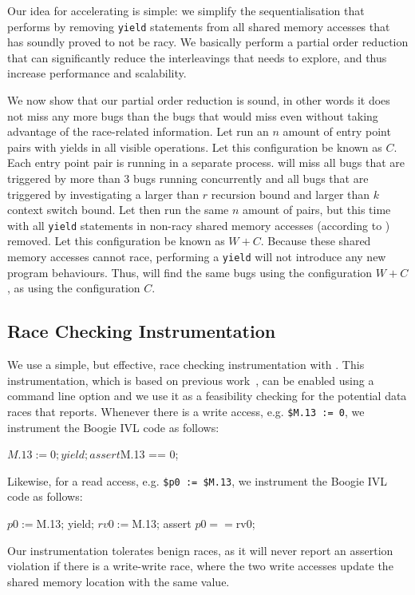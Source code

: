 Our idea for accelerating \corral is simple: we simplify the sequentialisation that \corral performs by removing \texttt{yield} statements from all shared memory accesses that \whoop has soundly proved to not be racy. We basically perform a partial order reduction that can significantly reduce the interleavings that \corral needs to explore, and thus increase performance and scalability.

We now show that our partial order reduction is sound, in other words it does not miss any more bugs than the bugs that \corral would miss even without taking advantage of the \whoop race-related information. Let \corral run an $n$ amount of entry point pairs with yields in all visible operations. Let this configuration be known as $C$. Each entry point pair is running in a separate \corral process. \corral will miss all bugs that are triggered by more than 3 bugs running concurrently and all bugs that are triggered by investigating a larger than $r$ recursion bound and larger than $k$ context switch bound. Let \corral then run the same $n$ amount of pairs, but this time with all \texttt{yield} statements in non-racy shared memory accesses (according to \whoop) removed. Let this configuration be known as $W+C$. Because these shared memory accesses cannot race, performing a \texttt{yield} will not introduce any new program behaviours. Thus, \corral will find the same bugs using the configuration $W+C$, as using the configuration $C$.

\subsection{Race Checking Instrumentation}
\label{bf:racechecking}

We use a simple, but effective, race checking instrumentation with \corral. This instrumentation, which is based on previous work~\cite{}, can be enabled using a command line option and we use it as a feasibility checking for the potential data races that \whoop reports. Whenever there is a write access, e.g. \texttt{\$M.13 := 0}, we instrument the Boogie IVL code as follows:

\begin{boogie}
$M.13 := 0;
yield;
assert $M.13 == 0;
\end{boogie}

Likewise, for a read access, e.g. \texttt{\$p0 := \$M.13}, we instrument the Boogie IVL code as follows:

\begin{boogie}
$p0 := $M.13;
yield;
$rv0 := $M.13;
assert $p0 == $rv0;
\end{boogie}

Our instrumentation tolerates benign races, as it will never report an assertion violation if there is a write-write race, where the two write accesses update the shared memory location with the same value.